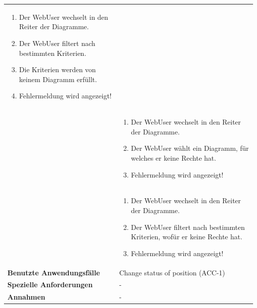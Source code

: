 \begin{longtable}[c]{|p{4cm}|p{10cm}|}
    \begin{enumerate} %
        \item Der WebUser wechselt in den Reiter der Diagramme.
        \item Der WebUser filtert nach bestimmten Kriterien.
        \item Die Kriterien werden von keinem Diagramm erfüllt.
        \item Fehlermeldung wird angezeigt!
    \end{enumerate}                                                                                                                               \\\cline{2-2} &
    \begin{enumerate} %
        \item Der WebUser wechselt in den Reiter der Diagramme.
        \item Der WebUser wählt ein Diagramm, für welches er keine Rechte hat.
        \item Fehlermeldung wird angezeigt!
    \end{enumerate}                                                                                                                               \\\cline{2-2} &
    \begin{enumerate} %
        \item Der WebUser wechselt in den Reiter der Diagramme.
        \item Der WebUser filtert nach bestimmten Kriterien, wofür er keine Rechte hat.
        \item Fehlermeldung wird angezeigt!
    \end{enumerate}                                                                                                                               \\ \hline
    \textbf{Benutzte Anwendungsfälle}      & Change status of position (ACC-1)                                                                                      \\ \hline
    \textbf{Spezielle Anforderungen}       & -                                                                                                               \\ \hline
    \textbf{Annahmen}                      & -                                                                                                               \\ \hline
\end{longtable}

